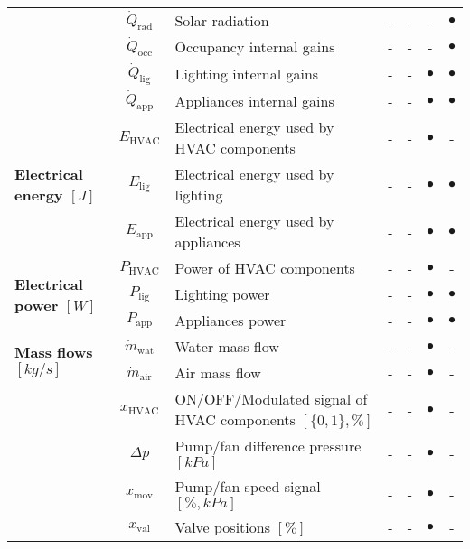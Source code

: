 \documentclass[10pt]{extarticle}
\begin{document}
\begin{table}[ht]
\begin{adjustwidth}{-1cm}{}
\begin{tabular}{l|c|l|cccc}
		& $\dot{Q}_{\text{rad}}$ & Solar radiation & - & - & - & $\bullet$  \\
		& $\dot{Q}_{\text{occ}}$ & Occupancy internal gains & - & - & - & $\bullet$  \\
		& $\dot{Q}_{\text{lig}}$ & Lighting internal gains & - & - & $\bullet$ & $\bullet$  \\
		& $\dot{Q}_{\text{app}}$ & Appliances internal gains & - & - & $\bullet$ & $\bullet$  \\
		\midrule
		\multirow{3}{*}{\textbf{Electrical energy $[J]$}} 
		& $E_{\text{HVAC}}$ & Electrical energy used by HVAC components & - & - &  $\bullet$ &- \\
		& $E_{\text{lig}}$ & Electrical energy used by lighting & - & - & $\bullet$ & $\bullet$ \\
		& $E_{\text{app}}$ & Electrical energy used by appliances & - & - & $\bullet$ & $\bullet$ \\
		\midrule
		\multirow{3}{*}{\textbf{Electrical power $[W]$}} 
		& $P_{\text{HVAC}}$ & Power of HVAC components & - & - &  $\bullet$ &- \\
		& $P_{\text{lig}}$ & Lighting power & - & - & $\bullet$ & $\bullet$ \\
		& $P_{\text{app}}$ & Appliances power & - & - & $\bullet$ & $\bullet$ \\
\midrule
		\multirow{2}{*}{\textbf{Mass flows $[kg/s]$}} &
		$\dot{m}_{\text{wat}}$ & Water mass flow & - & - & $\bullet$ & - \\
		& $\dot{m}_{\text{air}}$ & Air mass flow & - & - & $\bullet$ & - \\
		\midrule
		\multirow{5}{*}{\textbf{\shortstack[l]{Component signals }}} 
		& $x_{\text{HVAC}}$ & ON/OFF/Modulated signal of HVAC components $[\{0,1\},\%]$ & - & - & $\bullet$ & - \\
		& $\Delta p$ & Pump/fan difference pressure $[kPa]$ & - & - & $\bullet$ & - \\
		& $x_{\text{mov}}$ & Pump/fan speed signal $[\%,kPa]$ & - & - & $\bullet$ & - \\
		& $x_{\text{val}}$ & Valve positions $[\%]$ & - & - & $\bullet$ & - \\

\end{tabular}
\end{adjustwidth}
\end{table}
\end{document}
